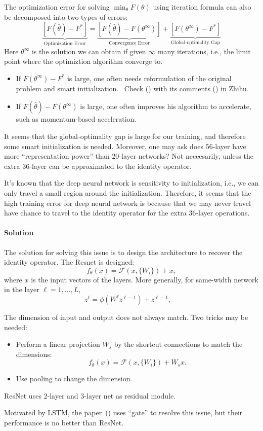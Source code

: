 The optimization error for solving $\min_{\theta}F(\theta)$ using iteration formula can also be decomposed into two types of errors:
\[
\underbrace{[F(\hat{\theta}) - F^*]}_{\text{Optimization Error}} = 
\underbrace{[F(\hat{\theta}) - F(\theta^\infty)]}_{\text{Convergence Error}} 
+ 
\underbrace{[F(\theta^\infty)  - F^*]}_{\text{Global-optimality Gap}}
\]
Here $\theta^\infty$ is the solution we can obtain if given $\infty$ many iterations, i.e., the limit point where the optimiztion algorithm converge to.
\begin{itemize}
\item
If $F(\theta^\infty) - F^*$ is large, one often needs reformulation of the original problem and smart initialization.~ Check (\cite{frankle2018the}) with its comments (\cite{WinNT}) in Zhihu.
\item
If $F(\hat{\theta}) - F(\theta^\infty) $ is large, one often improves his algorithm to accelerate, such as momentum-based acceleration.
\end{itemize}

It seems that the global-optimality gap is large for our training, and therefore some smart initialization is needed.
Moreover, one may ask does $56$-layer have more ``representation power'' than $20$-layer networks?
Not neceesarily, unless the extra $36$-layer can be approximated to the identity operator.

It's known that the deep neural network is sensitivity to initialization, i.e., we can only travel a small region around the initialization.
Therefore, it seems that the high training error for deep neural network is because that we may never travel have chance to travel to the identity operator for the extra $36$-layer operations.


\paragraph{Solution}
The solution for solving this issue is to design the architecture to recover the identity operator. The Resnet is designed:
\[
f_{\theta}(x) = \mathcal{F}(x,\{W_i\})+x,
\]
where $x$ is the input vectors of the layers.
More generally, for same-width network in the layer $\ell=1,\dots,L$,
\[
z^{\ell} = \phi(W^{\ell}z^{\ell-1}) + z^{\ell-1},\quad
\]

\begin{remark}
The dimension of input and output does not always match. Two tricks may be needed:
\begin{itemize}
\item
Perform a linear projection $W_s$ by the
shortcut connections to match the dimensions:
\[
f_{\theta}(x) =\mathcal{F}(x,\{W_i\})+W_sx.
\]
\item
Use pooling to change the dimension.
\end{itemize}
\end{remark}

\begin{remark}
ResNet uses $2$-layer and $3$-layer net as residual module.
\end{remark}

\begin{remark}
Motivated by LSTM, the paper~(\cite{srivastava2015highway}) uses ``gate'' to resolve this issue, but their performance is no better than ResNet.
\end{remark}









